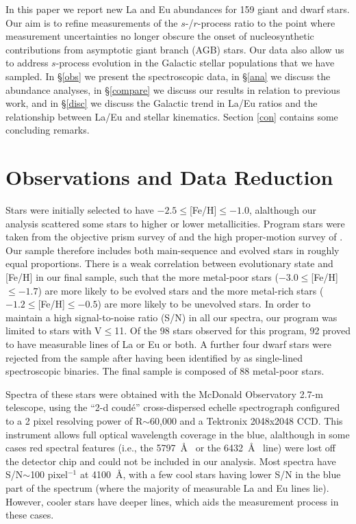 \documentclass[12pt,preprint]{aastex}
\begin{document}
In this paper we report new La and Eu abundances for 159 giant and dwarf stars.  Our aim is to refine measurements of the $s$-/$r$-process ratio to the point where measurement uncertainties no longer obscure the onset of nucleosynthetic contributions from asymptotic giant branch (AGB)  stars.  Our data also allow us to address $s$-process evolution in the Galactic stellar populations that we have sampled.  In \S \ref{obs} we present the spectroscopic data, in \S \ref{ana} we discuss the abundance analyses, in \S \ref{compare} we discuss our results in relation to previous work, and in \S \ref{disc} we discuss the Galactic trend in La/Eu ratios and the relationship between La/Eu and stellar kinematics.  Section \ref{con} contains some concluding remarks.


\section{Observations and Data Reduction \label{obs}}
Stars were initially selected to have $-2.5\leq$[Fe/H]$\leq-1.0$, alalthough our analysis scattered some stars to  higher or lower metallicities.  Program stars were taken from the objective prism survey of \citet{Bond1980} and the high proper-motion survey of \citet{Carney1994}.   Our sample therefore includes both main-sequence and evolved stars in roughly equal proportions.  There  is  a weak correlation between evolutionary state and [Fe/H] in our final sample, such that the more metal-poor stars ($-3.0\leq$[Fe/H]$\leq-1.7$) are more likely to be evolved stars and the more metal-rich stars ($-1.2\leq$[Fe/H]$\leq-0.5$) are more  likely to be unevolved stars.  In order to maintain a high signal-to-noise ratio (S/N) in all our spectra, our program was limited to stars with V$\leq$11.  Of the 98 stars observed for this program, 92 proved to have measurable lines of La or Eu or both.  A further four dwarf stars were rejected from the  sample after having been identified by \citet{Latham2002} as single-lined spectroscopic binaries.  The  final sample is composed of 88 metal-poor stars.

Spectra of these stars were obtained with the McDonald Observatory 2.7-m telescope, using the ``2-d coud\'{e}'' cross-dispersed echelle spectrograph configured to a 2 pixel resolving power of R$\sim$60,000 and a Tektronix 2048x2048 CCD.   This instrument allows full optical wavelength coverage in the blue, alalthough in some cases red spectral features (i.e., the 5797~\AA~ or the 6432~\AA~  line)  were lost off the detector chip and could not be included in our analysis.  Most spectra have S/N$\sim$100 pixel$^{-1}$ at 4100~\AA,  with a few cool  stars having lower S/N in the blue part of the spectrum (where the majority of measurable La and Eu lines lie).  However, cooler stars have deeper lines, which aids the measurement process in these  cases.
\end{document}
